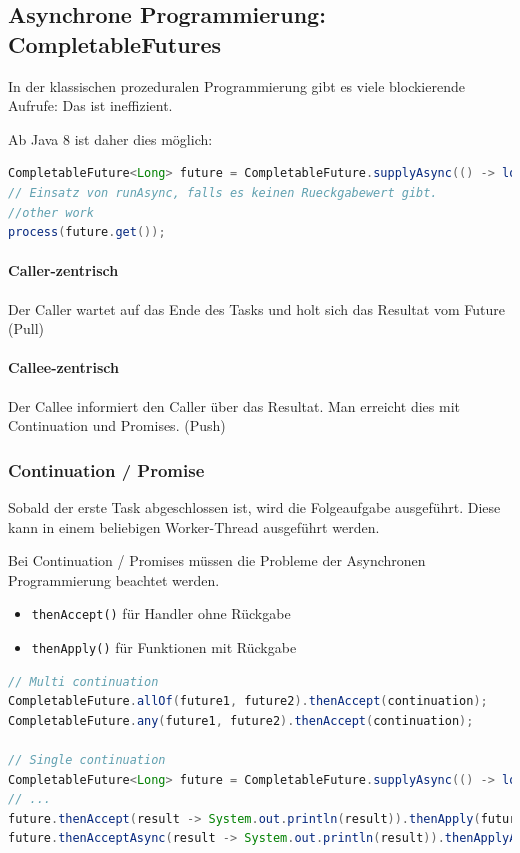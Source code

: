 \subsection{Asynchrone Programmierung: CompletableFutures}

In der klassischen prozeduralen Programmierung gibt es viele blockierende Aufrufe: Das ist ineffizient. 

Ab Java 8 ist daher dies möglich: 
\begin{lstlisting}[language=java]
CompletableFuture<Long> future = CompletableFuture.supplyAsync(() -> longOperation());
// Einsatz von runAsync, falls es keinen Rueckgabewert gibt.
//other work
process(future.get());
\end{lstlisting}

\paragraph{Caller-zentrisch} Der Caller wartet auf das Ende des Tasks und holt sich das Resultat vom Future (Pull)

\paragraph{Callee-zentrisch} Der Callee informiert den Caller über das Resultat. Man erreicht dies mit Continuation und Promises. (Push)

\subsubsection{Continuation / Promise}
Sobald der erste Task abgeschlossen ist, wird die Folgeaufgabe ausgeführt. Diese kann in einem beliebigen Worker-Thread ausgeführt werden.

Bei Continuation / Promises müssen die Probleme der Asynchronen Programmierung beachtet werden.

\begin{itemize}
	\item \lstinline|thenAccept()| für Handler ohne Rückgabe
	\item \lstinline|thenApply()| für Funktionen mit Rückgabe
\end{itemize}

\begin{lstlisting}[language=java]
// Multi continuation
CompletableFuture.allOf(future1, future2).thenAccept(continuation);
CompletableFuture.any(future1, future2).thenAccept(continuation);

// Single continuation
CompletableFuture<Long> future = CompletableFuture.supplyAsync(() -> longOperation());
// ...
future.thenAccept(result -> System.out.println(result)).thenApply(future3); // muss nicht asynchron sein.
future.thenAcceptAsync(result -> System.out.println(result)).thenApplyAsync(future3); // asynchrone anwendung -> garantiert asynchron
\end{lstlisting}


